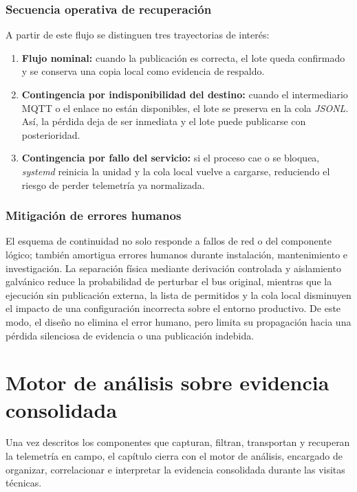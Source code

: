 \subsubsection{Secuencia operativa de recuperación}
A partir de este flujo se distinguen tres trayectorias de interés:

\begin{enumerate}
    \item \textbf{Flujo nominal:} cuando la publicación es correcta, el lote queda confirmado y se conserva una copia local como evidencia de respaldo.
    \item \textbf{Contingencia por indisponibilidad del destino:} cuando el intermediario \ac{MQTT} o el enlace no están disponibles, el lote se preserva en la cola \textit{JSONL}. Así, la pérdida deja de ser inmediata y el lote puede publicarse con posterioridad.
    \item \textbf{Contingencia por fallo del servicio:} si el proceso cae o se bloquea, \textit{systemd} reinicia la unidad y la cola local vuelve a cargarse, reduciendo el riesgo de perder telemetría ya normalizada.
\end{enumerate}

\subsubsection{Mitigación de errores humanos}
El esquema de continuidad no solo responde a fallos de red o del componente lógico; también amortigua errores humanos durante instalación, mantenimiento e investigación. La separación física mediante derivación controlada y aislamiento galvánico reduce la probabilidad de perturbar el bus original, mientras que la ejecución sin publicación externa, la lista de permitidos y la cola local disminuyen el impacto de una configuración incorrecta sobre el entorno productivo. De este modo, el diseño no elimina el error humano, pero limita su propagación hacia una pérdida silenciosa de evidencia o una publicación indebida.

\section{Motor de análisis sobre evidencia consolidada}
Una vez descritos los componentes que capturan, filtran, transportan y recuperan la telemetría en campo, el capítulo cierra con el motor de análisis, encargado de organizar, correlacionar e interpretar la evidencia consolidada durante las visitas técnicas.

